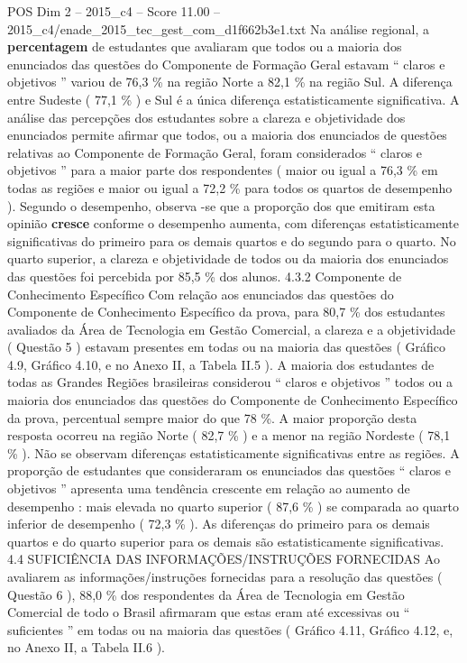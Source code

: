 \begin{textsample}{POS Dim 2 – 2015\_c4 – Score 11.00 – 2015\_c4/enade\_2015\_tec\_gest\_com\_d1f662b3e1.txt}
Na análise regional, a \textbf{percentagem} de estudantes que avaliaram que todos ou a maioria dos enunciados das questões do Componente de Formação Geral estavam “ claros e objetivos ” variou de 76,3 \% na região Norte a 82,1 \% na região Sul.
A diferença entre Sudeste ( 77,1 \% ) e Sul é a única diferença estatisticamente significativa.
A análise das percepções dos estudantes sobre a clareza e objetividade dos enunciados permite afirmar que todos, ou a maioria dos enunciados de questões relativas ao Componente de Formação Geral, foram considerados “ claros e objetivos ” para a maior parte dos respondentes ( maior ou igual a 76,3 \% em todas as regiões e maior ou igual a 72,2 \% para todos os quartos de desempenho ).
Segundo o desempenho, observa -se que a proporção dos que emitiram esta opinião \textbf{cresce} conforme o desempenho aumenta, com diferenças estatisticamente significativas do primeiro para os demais quartos e do segundo para o quarto.
No quarto superior, a clareza e objetividade de todos ou da maioria dos enunciados das questões foi percebida por 85,5 \% dos alunos. 4.3.2 Componente de Conhecimento Específico Com relação aos enunciados das questões do Componente de Conhecimento Específico da prova, para 80,7 \% dos estudantes avaliados da Área de Tecnologia em Gestão Comercial, a clareza e a objetividade ( Questão 5 ) estavam presentes em todas ou na maioria das questões ( Gráfico 4.9, Gráfico 4.10, e no Anexo II, a Tabela II.5 ).
A maioria dos estudantes de todas as Grandes Regiões brasileiras considerou “ claros e objetivos ” todos ou a maioria dos enunciados das questões do Componente de Conhecimento Específico da prova, percentual sempre maior do que 78 \%.
A maior proporção desta resposta ocorreu na região Norte ( 82,7 \% ) e a menor na região Nordeste ( 78,1 \% ).
Não se observam diferenças estatisticamente significativas entre as regiões.
A proporção de estudantes que consideraram os enunciados das questões “ claros e objetivos ” apresenta uma tendência crescente em relação ao aumento de desempenho : mais elevada no quarto superior ( 87,6 \% ) se comparada ao quarto inferior de desempenho ( 72,3 \% ).
As diferenças do primeiro para os demais quartos e do quarto superior para os demais são estatisticamente significativas. 4.4 SUFICIÊNCIA DAS INFORMAÇÕES/INSTRUÇÕES FORNECIDAS Ao avaliarem as informações/instruções fornecidas para a resolução das questões ( Questão 6 ), 88,0 \% dos respondentes da Área de Tecnologia em Gestão Comercial de todo o Brasil afirmaram que estas eram até excessivas ou “ suficientes ” em todas ou na maioria das questões ( Gráfico 4.11, Gráfico 4.12, e, no Anexo II, a Tabela II.6 ).

\end{textsample}

